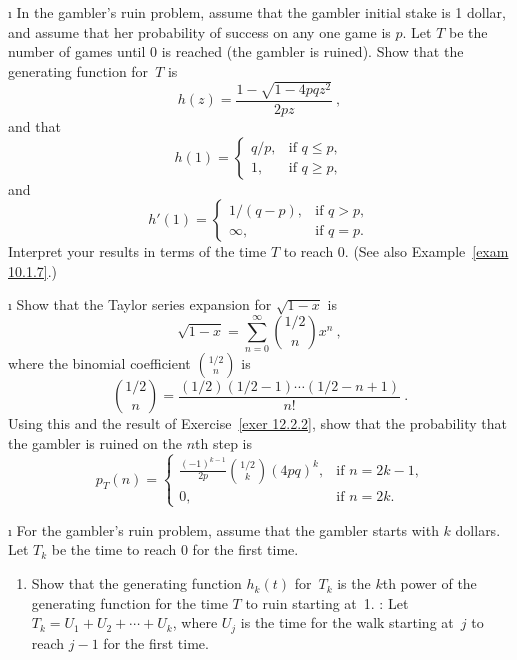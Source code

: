 \exercises
\begin{LJSItem}
 
\i\label{exer 12.2.2} In the gambler's ruin problem, assume that the gambler initial stake
is 1 dollar, and assume that her probability of success on any one game is $p$.  Let $T$ be the
number of games until 0 is reached (the gambler is ruined).  Show that the  generating
function for~$T$ is  $$
h(z) = \frac{1 - \sqrt{1 - 4pqz^2}}{2pz}\ ,
$$
and that
$$
h(1) = \left \{ \begin{array}{ll}
              q/p, & \mbox{if $q \leq p$}, \\
                1, & \mbox{if $q \geq p,$} 
         \end{array}
         \right.    
$$
and
$$
h'(1) = \left \{ \begin{array}{ll}
               1/(q - p), & \mbox{if $q > p$}, \\
                  \infty, & \mbox{if $q = p.$}
         \end{array}
         \right. 
$$
Interpret your results in terms of the time $T$ to reach 0.  (See also 
Example~\ref{exam 10.1.7}.)

\i\label{exer 12.2.3} Show that the Taylor series expansion for $\sqrt{1 - x}$ is
$$
 \sqrt{1 - x} = \sum_{n = 0}^\infty  {{1/2} \choose n} x^n\ ,
$$
where the binomial coefficient ${1/2} \choose n$ is
$$
{{1/2} \choose n} = \frac{(1/2)(1/2 - 1) \cdots (1/2 - n + 1)}{n!}\ .  
$$
Using this and the result of Exercise~\ref{exer 12.2.2}, show that the probability
that the gambler is ruined on the $n$th step is
$$
p_T(n) = \left \{ \begin{array}{ll}
 \frac{(-1)^{k - 1}}{2p} {{1/2} \choose k} (4pq)^k, & \mbox{if $n = 2k - 1$,} \\
                                                 0, & \mbox{if $n = 2k$.}
                  \end{array}
         \right.   
$$

\i\label{exer 12.2.4} For the gambler's ruin problem, assume that the
gambler starts with $k$ dollars.  Let $T_k$ be the time to reach 0 for the
first time.

\begin{enumerate}
\item Show that the generating function $h_k(t)$ for~$T_k$ is the $k$th
power of the generating function for the time $T$ to ruin starting at~1.  : Let $T_k
= U_1 + U_2 +\cdots+ U_k$, where $U_j$ is the time for the walk starting at~$j$ to reach
$j - 1$ for the first time.


\end{enumerate}
\end{LJSItem}
